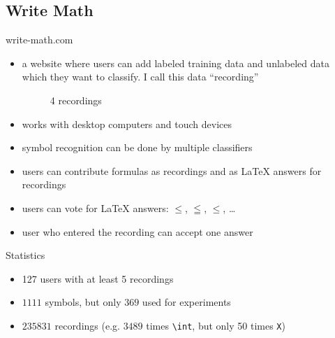 \subsection{Write Math}

\begin{frame}{write-math.com}
    \begin{itemize}
        \item a website where users can add labeled training data and unlabeled
              data which they want to classify. I call this data \enquote{recording}
        \begin{figure}[ht]
            \centering
            \qquad
            \qquad
            \qquad
            \caption*{4 recordings}
        \end{figure}
        \item works with desktop computers and touch devices
        \item symbol recognition can be done by multiple classifiers
        \item users can contribute formulas as recordings and as \LaTeX{} answers
              for recordings
        \item users can vote for \LaTeX{} answers:
              \Large $\leq$, $\leqq$, $\leqslant$, \dots \normalsize
        \item user who entered the recording can accept one answer
    \end{itemize}
\end{frame}



\begin{frame}[fragile]{Statistics}
    \begin{itemize}
        \item 127 users with at least 5 recordings
        \item $\num{1111}$ symbols, but only $\num{369}$ used for experiments
        \item $\num{235831}$ recordings (e.g. $\num{3489}$ times \verb+\int+, but only 50 times \verb+X+)
    \end{itemize}
\end{frame}

